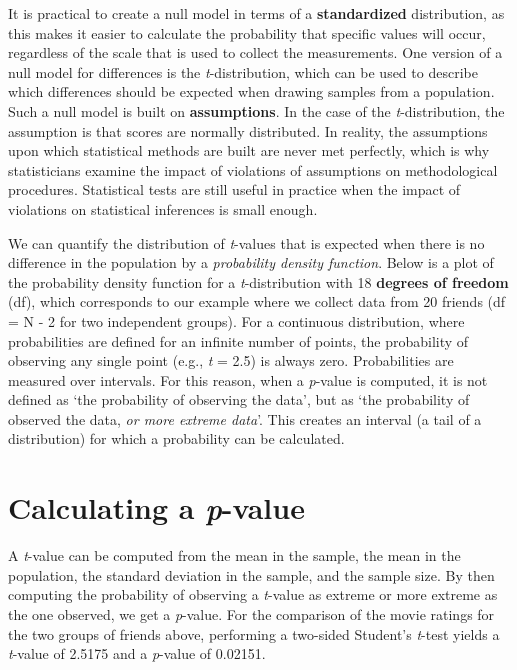 \documentclass[
  oneside]{book}
\begin{document}
It is practical to create a null model in terms of a \textbf{standardized} distribution, as this makes it easier to calculate the probability that specific values will occur, regardless of the scale that is used to collect the measurements. One version of a null model for differences is the \emph{t}-distribution, which can be used to describe which differences should be expected when drawing samples from a population. Such a null model is built on \textbf{assumptions}. In the case of the \emph{t}-distribution, the assumption is that scores are normally distributed. In reality, the assumptions upon which statistical methods are built are never met perfectly, which is why statisticians examine the impact of violations of assumptions on methodological procedures. Statistical tests are still useful in practice when the impact of violations on statistical inferences is small enough.

We can quantify the distribution of \emph{t}-values that is expected when there is no difference in the population by a \emph{probability density function}. Below is a plot of the probability density function for a \emph{t}-distribution with 18 \textbf{degrees of freedom} (df), which corresponds to our example where we collect data from 20 friends (df = N - 2 for two independent groups). For a continuous distribution, where probabilities are defined for an infinite number of points, the probability of observing any single point (e.g., \emph{t} = 2.5) is always zero. Probabilities are measured over intervals. For this reason, when a \emph{p}-value is computed, it is not defined as `the probability of observing the data', but as `the probability of observed the data, \emph{or more extreme data}'. This creates an interval (a tail of a distribution) for which a probability can be calculated.

\hypertarget{calculating-a-p-value}{%
\section{\texorpdfstring{Calculating a \emph{p}-value}{Calculating a p-value}}\label{calculating-a-p-value}}

A \emph{t}-value can be computed from the mean in the sample, the mean in the population, the standard deviation in the sample, and the sample size. By then computing the probability of observing a \emph{t}-value as extreme or more extreme as the one observed, we get a \emph{p}-value. For the comparison of the movie ratings for the two groups of friends above, performing a two-sided Student's \emph{t}-test yields a \emph{t}-value of 2.5175 and a \emph{p}-value of 0.02151.
\end{document}
